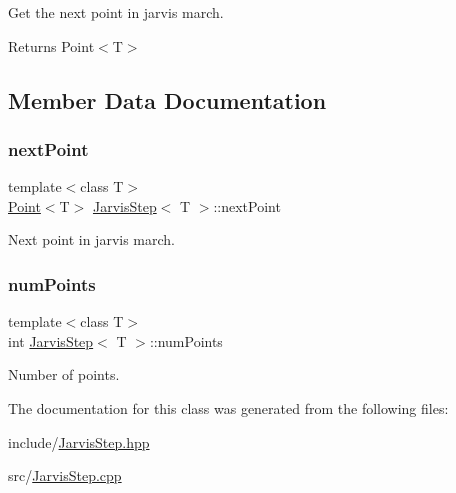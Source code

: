 Get the next point in jarvis march. 

\begin{DoxyReturn}{Returns}
Point$<$\+T$>$ 
\end{DoxyReturn}

\begin{DoxyCode}{0}

\end{DoxyCode}


\subsection{Member Data Documentation}
\mbox{\label{classJarvisStep_a35b1bc8bd742976a76dd47a5850f67fa}} 
\subsubsection{\texorpdfstring{next\+Point}{nextPoint}}
{\footnotesize\ttfamily template$<$class T$>$ \\
\mbox{\hyperlink{classPoint}{Point}}$<$T$>$ \mbox{\hyperlink{classJarvisStep}{Jarvis\+Step}}$<$ T $>$\+::next\+Point\hspace{0.3cm}{\ttfamily [private]}}



Next point in jarvis march. 

\mbox{\label{classJarvisStep_acda18cb9b72668a839239761aeedd7fa}} 
\subsubsection{\texorpdfstring{num\+Points}{numPoints}}
{\footnotesize\ttfamily template$<$class T$>$ \\
int \mbox{\hyperlink{classJarvisStep}{Jarvis\+Step}}$<$ T $>$\+::num\+Points\hspace{0.3cm}{\ttfamily [private]}}



Number of points. 



The documentation for this class was generated from the following files\+:\begin{DoxyCompactItemize}
\item 
include/\mbox{\hyperlink{JarvisStep_8hpp}{Jarvis\+Step.\+hpp}}\item 
src/\mbox{\hyperlink{JarvisStep_8cpp}{Jarvis\+Step.\+cpp}}\end{DoxyCompactItemize}
